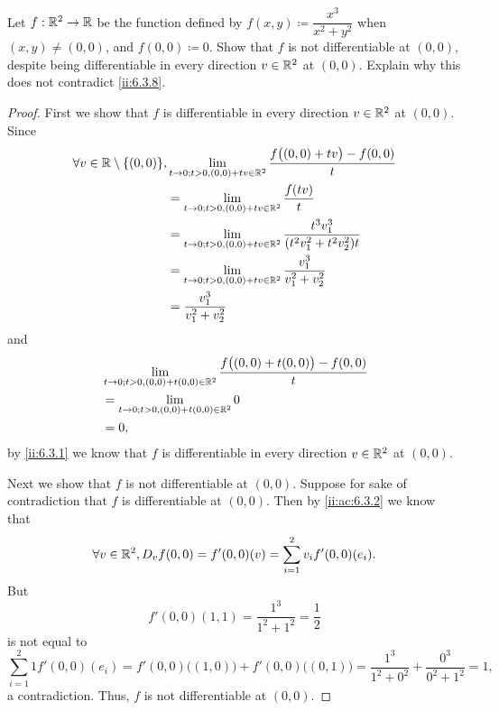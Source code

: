 \begin{ex}\label{ii:ex:6.3.3}
  Let \(f : \mathbb{R}^2 \to \mathbb{R}\) be the function defined by \(f(x, y) \coloneqq \dfrac{x^3}{x^2 + y^2}\) when \((x, y) \neq (0, 0)\), and \(f(0, 0) \coloneqq 0\).
  Show that \(f\) is not differentiable at \((0, 0)\), despite being differentiable in every direction \(v \in \mathbb{R}^2\) at \((0, 0)\).
  Explain why this does not contradict \cref{ii:6.3.8}.
\end{ex}

\begin{proof}
  First we show that \(f\) is differentiable in every direction \(v \in \mathbb{R}^2\) at \((0, 0)\).
  Since
  \begin{align*}
    \forall v \in \R \setminus \set{(0, 0)}, & \lim_{t \to 0 ; t > 0, (0, 0) + tv \in \R^2} \dfrac{f\big((0, 0) + tv\big) - f(0, 0)}{t}    \\
                                             & = \lim_{t \to 0 ; t > 0, (0, 0) + tv \in \R^2} \dfrac{f(tv)}{t}                             \\
                                             & = \lim_{t \to 0 ; t > 0, (0, 0) + tv \in \R^2} \dfrac{t^3 v_1^3}{(t^2 v_1^2 + t^2 v_2^2) t} \\
                                             & = \lim_{t \to 0 ; t > 0, (0, 0) + tv \in \R^2} \dfrac{v_1^3}{v_1^2 + v_2^2}                 \\
                                             & = \dfrac{v_1^3}{v_1^2 + v_2^2}
  \end{align*}
  and
  \begin{align*}
     & \lim_{t \to 0 ; t > 0, (0, 0) + t (0, 0) \in \mathbb{R}^2} \dfrac{f\big((0, 0) + t(0, 0)\big) - f(0, 0)}{t} \\
     & = \lim_{t \to 0 ; t > 0, (0, 0) + t (0, 0) \in \mathbb{R}^2} 0                                              \\
     & = 0,
  \end{align*}
  by \cref{ii:6.3.1} we know that \(f\) is differentiable in every direction \(v \in \mathbb{R}^2\) at \((0, 0)\).

  Next we show that \(f\) is not differentiable at \((0, 0)\).
  Suppose for sake of contradiction that \(f\) is differentiable at \((0, 0)\).
  Then by \cref{ii:ac:6.3.2} we know that
  \[
    \forall v \in \mathbb{R}^2, D_v f(0, 0) = f'(0, 0)(v) = \sum_{i = 1}^2 v_i f'(0, 0)(e_i).
  \]
  But
  \[
    f'(0, 0)(1, 1) = \dfrac{1^3}{1^2 + 1^2} = \dfrac{1}{2}
  \]
  is not equal to
  \[
    \sum_{i = 1}^2 1 f'(0, 0)(e_i) = f'(0, 0)\big((1, 0)\big) + f'(0, 0)\big((0, 1)\big) = \dfrac{1^3}{1^2 + 0^2} + \dfrac{0^3}{0^2 + 1^2} = 1,
  \]
  a contradiction.
  Thus, \(f\) is not differentiable at \((0, 0)\).


\end{proof}
